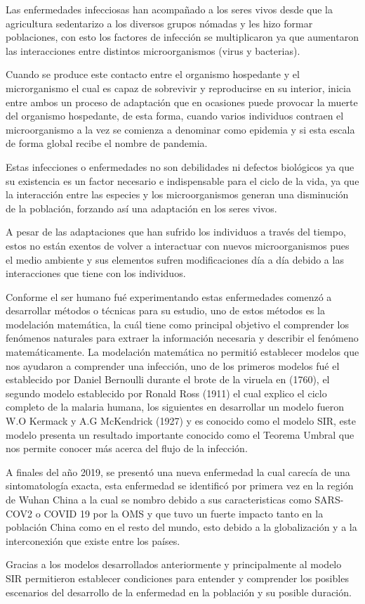 
Las enfermedades infecciosas han acompañado a los seres vivos desde que la agricultura sedentarizo a los diversos grupos nómadas y les hizo formar poblaciones, con esto los factores de infección se multiplicaron ya que aumentaron las interacciones entre distintos microorganismos (virus y bacterias).

Cuando se produce este contacto entre el organismo hospedante y el microrganismo el cual es capaz de sobrevivir y reproducirse en su interior, inicia entre ambos un proceso de adaptación que en ocasiones puede provocar la muerte del organismo hospedante, de esta forma, cuando varios individuos contraen el microorganismo a la vez se comienza a denominar como epidemia y si esta escala de forma global recibe el nombre de pandemia.

Estas infecciones o enfermedades no son debilidades ni defectos biológicos ya que su existencia es un factor necesario e indispensable para el ciclo de la vida, ya que la interacción entre las especies y los microorganismos generan una disminución de la población, forzando así una adaptación en los seres vivos.

A pesar de las adaptaciones que han sufrido los individuos a través del tiempo, estos no están exentos de volver a interactuar con nuevos microorganismos pues el medio ambiente y sus elementos sufren modificaciones día a día debido a las interacciones que tiene con los individuos. %

Conforme el ser humano fué experimentando estas enfermedades comenzó a desarrollar métodos o técnicas para su estudio, uno de estos métodos es la modelación matemática, la cuál tiene como principal objetivo el comprender los fenómenos naturales para extraer la información necesaria y describir el fenómeno matemáticamente. La modelación matemática no permitió establecer modelos que nos ayudaron a comprender una infección, uno de los primeros modelos fué el establecido por Daniel Bernoulli durante el brote de la viruela en (1760), el segundo modelo establecido por Ronald Ross (1911) el cual explico el ciclo completo de la malaria humana, los siguientes en desarrollar un modelo fueron W.O Kermack y A.G McKendrick (1927) y es conocido como el modelo SIR, este modelo presenta un resultado importante conocido como el Teorema Umbral que nos permite conocer más acerca del flujo de la infección.

A finales del año 2019, se presentó una nueva enfermedad la cual carecía de una sintomatología exacta, esta enfermedad se identificó por primera vez en la región de Wuhan China a la cual se nombro debido a sus caracteristicas como SARS-COV2 o COVID 19 por la OMS y que tuvo un fuerte impacto tanto en la población China como en el resto del mundo, esto debido a la globalización y a la interconexión que existe entre los países.

Gracias a los modelos desarrollados anteriormente y principalmente al modelo SIR permitieron establecer condiciones para entender y comprender los posibles escenarios del desarrollo de la enfermedad en la población y su posible duración.
